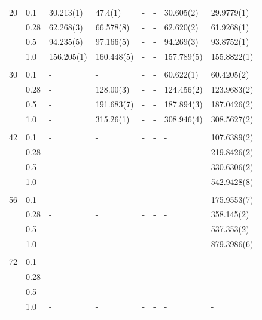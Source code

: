 \begin{table} [H]
\begin{tabularx}{\textwidth}{l:l|XXXXXX}
		20 & 0.1 & 30.213(1) & 47.4(1) & - & - & 30.605(2) & 29.9779(1) \\ 
		& 0.28 & 62.268(3) & 66.578(8) & - & - & 62.620(2) & 61.9268(1) \\
		& 0.5 & 94.235(5) & 97.166(5) & - & - & 94.269(3) & 93.8752(1) \\
		& 1.0 & 156.205(1) & 160.448(5) & - & - & 157.789(5) & 155.8822(1) \\ \hdashline \\
		
		30 & 0.1 & - & - & - & - & 60.622(1) & 60.4205(2) \\ 
		& 0.28 & - & 128.00(3) & - & - & 124.456(2) & 123.9683(2) \\
		& 0.5 & - & 191.683(7) & - & - & 187.894(3) & 187.0426(2) \\
		& 1.0 & - & 315.26(1) & - & - & 308.946(4) & 308.5627(2) \\ \hdashline \\
		
		42 & 0.1 & - & - & - & - & - & 107.6389(2) \\ 
		& 0.28 & - & - & - & - & - & 219.8426(2) \\
		& 0.5 & - & - & - & - & - & 330.6306(2) \\
		& 1.0 & - & - & - & - & - & 542.9428(8) \\ \hdashline \\
		
		56 & 0.1 & - & - & - & - & - & 175.9553(7) \\ 
		& 0.28 & - & - & - & - & - & 358.145(2) \\
		& 0.5 & - & - & - & - & - & 537.353(2) \\
		& 1.0 & - & - & - & - & - & 879.3986(6) \\ \hdashline \\
		
		72 & 0.1 & - & - & - & - & - & - \\ 
		& 0.28 & - & - & - & - & - & - \\
		& 0.5 & - & - & - & - & - & - \\
		& 1.0 & - & - & - & - & - & - \\ \hline\hline
	\end{tabularx}
\end{table}

